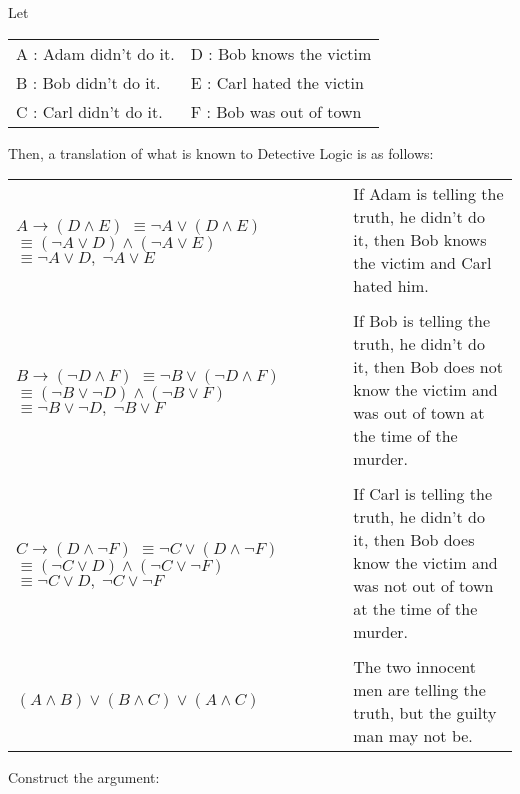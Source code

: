 \documentclass[12pt,addpoints]{exam}
\newcommand{\ra}{\rightarrow}
\begin{document}
\begin{questions}
\begin{solution}
Let 
	\begin{tabular}{ll}
	   A : Adam didn't do it. \hspace{0.6in} & D : Bob knows the victim \\
	   B : Bob didn't do it.				 & E : Carl hated the victin \\
	   C : Carl didn't do it.				 & F : Bob was out of town 
	\end{tabular}

Then, a translation of what is known to Detective Logic is as follows:

    \begin{tabular}{p{2.5in}p{3in}}
    	$A \ra (D \wedge E)$  $\equiv \neg A \vee (D \wedge E)\quad$ $\equiv (\neg A \vee D) \wedge (\neg A \vee E)\quad\quad\quad\quad$ $\equiv \neg A \vee D,\;  \neg A \vee E$  
    	& If Adam is telling the truth, he didn't do it, then Bob knows the victim and Carl hated him. \\
    	& \\
    	$B \ra (\neg D \wedge F)$ $\equiv \neg B \vee (\neg D \wedge F)$ $\equiv (\neg B \vee \neg D) \wedge (\neg B \vee F)\quad\quad\quad\quad$ $ \equiv \neg B \vee \neg D, \; \neg B \vee F$ 
    	& If Bob is telling the truth, he didn't do it, then Bob does not know the victim and was out of town at the time of the murder. \\
    	& \\
    	$C \ra (D \wedge \neg F)$ $\equiv \neg C \vee (D \wedge \neg F)$ $\equiv (\neg C \vee D) \wedge (\neg C \vee \neg F)\quad\quad\quad\quad$ $\equiv \neg C \vee D,\; \neg C \vee \neg F$ 
    	& If Carl is telling the truth, he didn't do it, then Bob does know the victim and was not out of town at the time of the murder. \\
    	& \\
    $(A \wedge B) \vee (B \wedge C) \vee (A \wedge C)$ & The two innocent men are telling the truth, but the guilty man may not be.
    \end{tabular}

Construct the argument:


\end{solution}
\end{questions}
\end{document}
